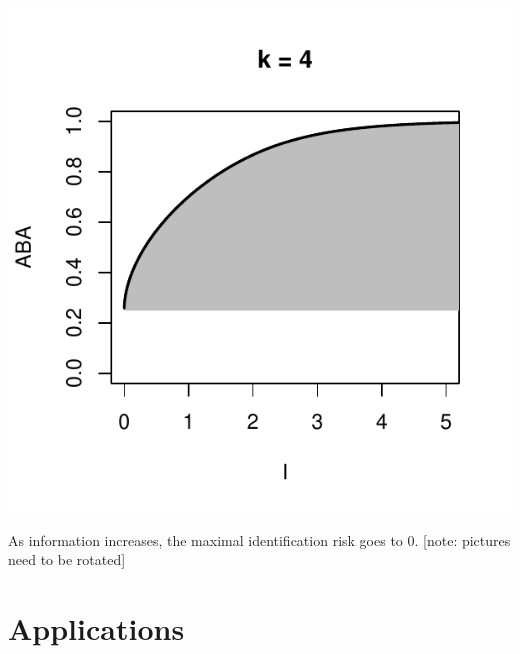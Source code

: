 \documentclass{beamer}
\begin{document}
\begin{frame}
\begin{center}
\includegraphics[scale = 0.34]{ck_4.pdf}
\end{center}
As information increases, the maximal identification risk goes to 0.
[note: pictures need to be rotated]

\end{frame}

\section{Applications}

\begin{frame}
\sectionpage
\end{frame}
\end{document}
